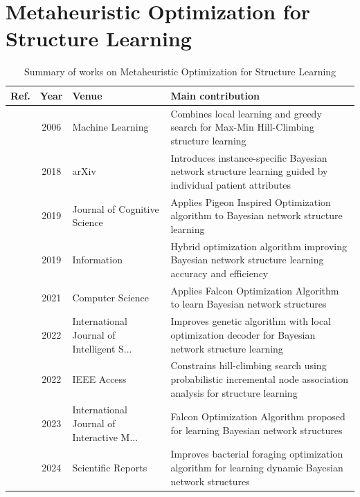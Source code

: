 \section{Metaheuristic Optimization for Structure Learning}\label{sec:theme5}
\begin{table}[!t]
\centering
\renewcommand{\arraystretch}{1.2}
\caption{Summary of works on Metaheuristic Optimization for Structure Learning}\label{tab:theme5}
\begin{tabularx}{\textwidth}{@{}l c p{3.6cm} X@{}}
\toprule
\textbf{Ref.} & \textbf{Year} & \textbf{Venue} & \textbf{Main contribution} \\
\midrule
\cite{tsamardinos2006max} & 2006 & Machine Learning & Combines local learning and greedy search for Max-Min Hill-Climbing structure learning \\
\cite{jabbari2018instance} & 2018 & arXiv & Introduces instance-specific Bayesian network structure learning guided by individual patient attributes \\
\cite{kareem2019pigeon} & 2019 & Journal of Cognitive Science & Applies Pigeon Inspired Optimization algorithm to Bayesian network structure learning \\
\cite{sun2019hybrid} & 2019 & Information & Hybrid optimization algorithm improving Bayesian network structure learning accuracy and efficiency \\
\cite{kareem2021falcon} & 2021 & Computer Science & Applies Falcon Optimization Algorithm to learn Bayesian network structures \\
\cite{sun2022bayesian} & 2022 & International Journal of Intelligent S... & Improves genetic algorithm with local optimization decoder for Bayesian network structure learning \\
\cite{liu2022bayesian} & 2022 & IEEE Access & Constrains hill-climbing search using probabilistic incremental node association analysis for structure learning \\
\cite{awla2023comparative} & 2023 & International Journal of Interactive M... & Falcon Optimization Algorithm proposed for learning Bayesian network structures \\
\cite{meng2024dynamic} & 2024 & Scientific Reports & Improves bacterial foraging optimization algorithm for learning dynamic Bayesian network structures \\
\bottomrule
\end{tabularx}
\end{table}

